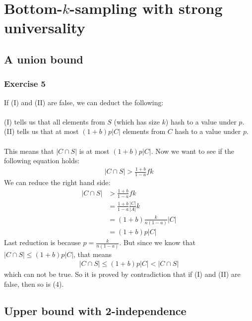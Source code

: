 \documentclass[a4paper]{article}
\begin{document}
\newpage
\section*{Bottom-$k$-sampling with strong universality}
\subsection*{A union bound}
\subsubsection*{Exercise 5}
If (I) and (II) are false, we can deduct the following: \\
\\
(I) tells us that all elements from $S$ (which has size $k$) hash to a value under $p$. \\
(II) tells us that at most $(1+b)p|C|$ elements from $C$ hash to a value under $p$. \\
\\
This means that $|C\cap S|$ is at most $(1+b)p|C|$. Now we want to see if the following equation holds:
\begin{align*}
|C\cap S| > \frac{1+b}{1-a}fk
\end{align*}
We can reduce the right hand side:
\begin{align*}
|C\cap S| &> \frac{1+b}{1-a}fk \\
&= \frac{1+b}{1-a}\frac{|C|}{|A|}k \\
&= (1+b)\frac{k}{n(1-a)}|C| \\
&= (1+b)p|C|
\end{align*}
Last reduction is because $p=\frac{k}{n(1-a)}$. But since we know that $|C\cap S|\leq (1+b)p|C|$, that means
\begin{align*}
|C\cap S|\leq (1+b)p|C| < |C\cap S|
\end{align*}
which can not be true. So it is proved by contradiction that if (I) and (II) are false, then so is (4).

\newpage
\subsection*{Upper bound with 2-independence}
\end{document}
